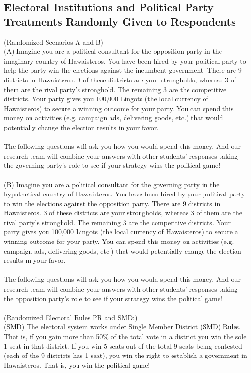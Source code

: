 \documentclass{article}
\begin{document}
\subsection{Electoral Institutions and Political Party Treatments Randomly Given to Respondents}
(Randomized Scenarios A and B)\\
(A) Imagine you are a political consultant for the opposition party in the imaginary country of Hawaisteros. You have been hired by your political party to help the party win the elections against the incumbent government. There are 9 districts in Hawaisteros. 3 of these districts are your strongholds, whereas 3 of them are the rival party's stronghold. The remaining 3 are the competitive districts. Your party gives you 100,000 Lingots (the local currency of Hawaisteros) to secure a winning outcome for your party. You can spend this money on activities (e.g. campaign ads, delivering goods, etc.) that would potentially change the election results in your favor. \\
\\
The following questions will ask you how you would spend this money. And our research team will combine your answers with other students' responses taking the governing party's role to see if your strategy wins the political game!\\
\\
(B) Imagine you are a political consultant for the governing party in the hypothetical country of Hawaisteros. You have been hired by your political party to win the elections against the opposition party. There are 9 districts in Hawaisteros. 3 of these districts are your strongholds, whereas 3 of them are the rival party's stronghold. The remaining 3 are the competitive districts. Your party gives you 100,000 Lingots (the local currency of Hawaisteros) to secure a winning outcome for your party. You can spend this money on activities (e.g. campaign ads, delivering goods, etc.) that would potentially change the election results in your favor.\\
\\
The following questions will ask you how you would spend this money. And our research team will combine your answers with other students' responses taking the opposition party's role to see if your strategy wins the political game!\\
\\
(Randomized Electoral Rules PR and SMD:)\\
(SMD) The electoral system works under Single Member District (SMD) Rules. That is, if you gain more than 50\% of the total vote in a district you win the sole 1 seat in that district. If you win 5 seats out of the total 9 seats being contested (each of the 9 districts has 1 seat), you win the right to establish a government in Hawaisteros. That is, you win the political game!\\
\end{document}
